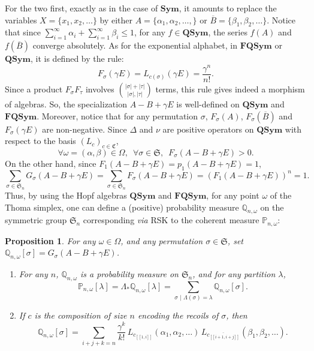 \documentclass[smallextended,nospthms]{svjour3}
\newtheorem{proposition}[theorem]{Proposition}
\theoremstyle{remark}
\newcommand{\sym}{\mathfrak{S}}
\newcommand{\comp}{\mathfrak{C}}
\newcommand{\Sym}{\mathbf{Sym}}
\newcommand{\QSym}{\mathbf{QSym}}
\newcommand{\FQSym}{\mathbf{FQSym}}
\newcommand{\proba}{\mathbb{P}}
\newcommand{\qproba}{\mathbb{Q}}
\newcommand{\lle}{\left[\!\left[}
\newcommand{\rre}{\right]\!\right]}
\begin{document}
For the two first, exactly as in the case of $\Sym$, it amounts to replace the variables $X=\{x_{1},x_{2},\ldots\}$ by either $A=\{\alpha_{1},\alpha_{2},\ldots,\}$ or $\overline{B}=\{\beta_{1},\beta_{2},\ldots\}$. Notice that since $\sum_{i=1}^{\infty}\alpha_{i}+\sum_{i=1}^{\infty}\beta_{i}\leq 1$, for any $f \in \QSym$, the series $f(A)$ and $f(\overline{B})$ converge absolutely. As for the exponential alphabet, in $\FQSym$ or $\QSym$, it is defined by the rule:
$$F_{\sigma}(\gamma E)=L_{c(\sigma)}(\gamma E)=\frac{\gamma^{n}}{n!}.$$
Since a product $F_{\sigma}F_{\tau}$ involves $\binom{|\sigma|+|\tau|}{|\sigma|,|\tau|}$ terms, this rule gives indeed a morphism of algebras. So, the specialization $A-B+\gamma E$ is well-defined on $\QSym$ and $\FQSym$. Moreover, notice that for any permutation $\sigma$, $F_{\sigma}(A)$, $F_{\sigma}(\overline{B})$ and $F_{\sigma}(\gamma E)$ are non-negative. Since $\Delta$ and $\nu$ are positive operators on $\QSym$ with respect to the basis $(L_{c})_{c \in \comp}$, 
$$\forall \omega=(\alpha,\beta)\in \Omega,\,\,\,\forall \sigma \in \sym,\,\,\,F_{\sigma}(A-B+\gamma E)>0.$$
On the other hand, since $F_{1}(A-B+\gamma E)=p_{1}(A-B+\gamma E)=1$,
$$\sum_{\sigma \in \sym_{n}}G_{\sigma}(A-B+\gamma E)=\sum_{\sigma \in \sym_{n}}F_{\sigma}(A-B+\gamma E)=(F_{1}(A-B+\gamma E))^{n}=1.$$
Thus, by using the Hopf algebras $\QSym$ and $\FQSym$, for any point $\omega$ of the Thoma simplex, one can define a (positive) probability measure $\qproba_{n,\omega}$ on the symmetric group $\sym_{n}$ corresponding \emph{via} RSK to the coherent measure $\proba_{n,\omega}$:
\begin{proposition}\label{frompermtopar}
For any $\omega \in \Omega$, and any permutation $\sigma \in \sym$, set $\qproba_{n,\omega}[\sigma]=G_{\sigma}(A-B+\gamma E)$.\vspace{2mm}
\begin{enumerate}
\item For any $n$, $\qproba_{n,\omega}$ is a probability measure on $\sym_{n}$, and for any partition $\lambda$,
$$\proba_{n,\omega}[\lambda]=\Lambda_{*}\qproba_{n,\omega}[\lambda]=\sum_{\sigma\,\,|\,\,\Lambda(\sigma)=\lambda}\qproba_{n,\omega}[\sigma].$$\vspace{2mm}
\item If $c$ is the composition of size $n$ encoding the recoils of $\sigma$, then
$$\qproba_{n,\omega}[\sigma]=\sum_{i+j+k=n}\frac{\gamma^{k}}{k!}\,L_{c_{\lle 1,i\rre}}(\alpha_{1},\alpha_{2},\ldots)\,L_{\overline{c_{\lle i+1,i+j\rre}}}(\beta_{1},\beta_{2},\ldots).$$\vspace{2mm}
\end{enumerate}
\end{proposition}
\end{document}
